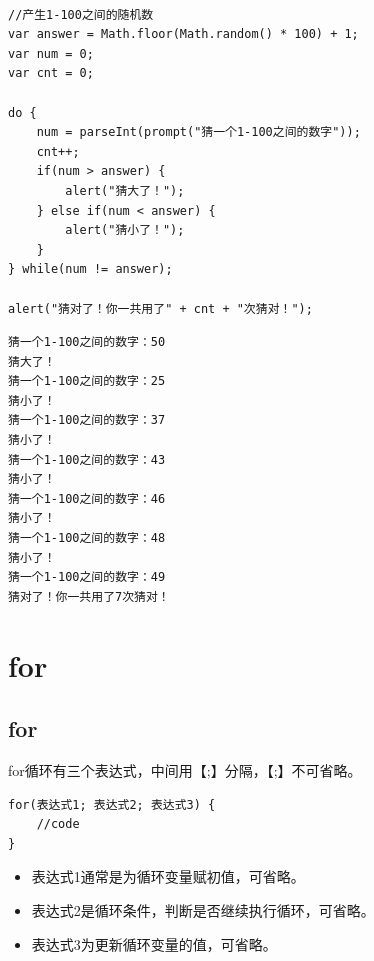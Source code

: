  \\

\begin{lstlisting}[style=htmlcssjs]
//产生1-100之间的随机数
var answer = Math.floor(Math.random() * 100) + 1;
var num = 0;
var cnt = 0;

do {
    num = parseInt(prompt("猜一个1-100之间的数字"));
    cnt++;
    if(num > answer) {
        alert("猜大了！");
    } else if(num < answer) {
        alert("猜小了！");
    }
} while(num != answer);

alert("猜对了！你一共用了" + cnt + "次猜对！");
\end{lstlisting}

\begin{tcolorbox}
	\begin{verbatim}
猜一个1-100之间的数字：50
猜大了！
猜一个1-100之间的数字：25
猜小了！
猜一个1-100之间的数字：37
猜小了！
猜一个1-100之间的数字：43
猜小了！
猜一个1-100之间的数字：46
猜小了！
猜一个1-100之间的数字：48
猜小了！
猜一个1-100之间的数字：49
猜对了！你一共用了7次猜对！
	\end{verbatim}
\end{tcolorbox}

\newpage

\section{for}

\subsection{for}

for循环有三个表达式，中间用【;】分隔，【;】不可省略。 \\

\begin{lstlisting}[style=htmlcssjs]
for(表达式1; 表达式2; 表达式3) {
    //code
}
\end{lstlisting}

\begin{itemize}
	\item 表达式1通常是为循环变量赋初值，可省略。
	\item 表达式2是循环条件，判断是否继续执行循环，可省略。
	\item 表达式3为更新循环变量的值，可省略。
\end{itemize}

 \\

